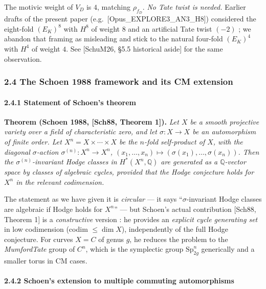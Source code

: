 \documentclass[
  11pt,
  a4paper,
]{amsart}
\begin{document}
The motivic weight of \(V_D\) is \(4\), matching \(\rho_{f_D}\). \emph{No Tate twist is needed.} Earlier drafts of the present paper (e.g.~{[}Opus\_EXPLORE3\_AN3\_H8{]}) considered the eight-fold \((E_K)^8\) with \(H^8\) of weight \(8\) and an artificial Tate twist \((-2)\) ; we abandon that framing as misleading and stick to the natural four-fold \((E_K)^4\) with \(H^4\) of weight \(4\). See {[}SchuM26, §5.5 historical aside{]} for the same observation.

\hypertarget{the-schoen-1988-framework-and-its-cm-extension}{%
\subsubsection{2.4 The Schoen 1988 framework and its CM extension}\label{the-schoen-1988-framework-and-its-cm-extension}}

\hypertarget{statement-of-schoens-theorem}{%
\paragraph{2.4.1 Statement of Schoen's theorem}\label{statement-of-schoens-theorem}}

\textbf{Theorem (Schoen 1988, {[}Sch88, Theorem 1{]}).} \emph{Let \(X\) be a smooth projective variety over a field of characteristic zero, and let \(\sigma : X \to X\) be an automorphism of finite order. Let \(X^n = X \times \cdots \times X\) be the \(n\)-fold self-product of \(X\), with the diagonal \(\sigma\)-action \(\sigma^{(n)} : X^n \to X^n\), \((x_1, \ldots, x_n) \mapsto (\sigma(x_1), \ldots, \sigma(x_n))\). Then the \(\sigma^{(n)}\)-invariant Hodge classes in \(H^*(X^n, \mathbb{Q})\) are generated as a \(\mathbb{Q}\)-vector space by classes of algebraic cycles, provided that the Hodge conjecture holds for \(X^n\) in the relevant codimension.}

The statement as we have given it is \emph{circular} --- it says ``\(\sigma\)-invariant Hodge classes are algebraic if Hodge holds for \(X^n\)'' --- but Schoen's actual contribution {[}Sch88, Theorem 1{]} is a \emph{constructive} version : he provides an \emph{explicit cycle generating set} in low codimension (codim \(\leq \dim X\)), independently of the full Hodge conjecture. For curves \(X = C\) of genus \(g\), he reduces the problem to the \emph{MumfordTate} group of \(C^n\), which is the symplectic group \(\mathrm{Sp}_{2g}^n\) generically and a smaller torus in CM cases.

\hypertarget{schoens-extension-to-multiple-commuting-automorphisms}{%
\paragraph{2.4.2 Schoen's extension to multiple commuting automorphisms}\label{schoens-extension-to-multiple-commuting-automorphisms}}
\end{document}
